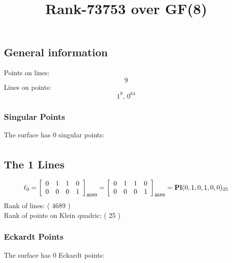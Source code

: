 \documentclass{article}
\newcommand\setTBstruts{\def\T{\rule{0pt}{2.6ex}}%
\def\B{\rule[-1.2ex]{0pt}{0pt}}}
\begin{document}
 
\setTBstruts



{\allowdisplaybreaks%






\title{Rank-73753 over GF(8)}
\author{}%
\maketitle%
%
{}



\subsection*{General information}
Points on lines:
$$
9$$
Lines on points:
$$
1^9,\,0^{64}$$
\subsubsection*{Singular Points}
The surface has 0 singular points:\\
\begin{align*}
\end{align*}
\subsection*{The 1 Lines}
$$
\ell_{0} = 
\left[
\begin{array}{*{4}{r}}
0 & 1 & 1 & 0\\
0 & 0 & 0 & 1\\
\end{array}
\right]
_{4689}
=
\left[
\begin{array}{*{4}c}
0  & 1  & 1  & 0\\
0  & 0  & 0  & 1\\
\end{array}
\right]_{4689}
={\rm\bf Pl}(0,1,0,1,0,0 )_{25}$$
Rank of lines: ( 4689 )\\
Rank of points on Klein quadric: ( 25 )\\
\subsubsection*{Eckardt Points}
The surface has 0 Eckardt points:\\
}
\end{document}
